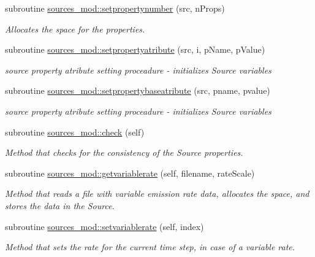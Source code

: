 \begin{DoxyCompactItemize}
subroutine \mbox{\hyperlink{namespacesources__mod_a9c2faf82364c7af60abc1ec25b23c7b5}{sources\+\_\+mod\+::setpropertynumber}} (src, n\+Props)
\begin{DoxyCompactList}\small\item\em Allocates the space for the properties. \end{DoxyCompactList}\item 
subroutine \mbox{\hyperlink{namespacesources__mod_a2b7d1a3856735fdb0fb4ff142e38668d}{sources\+\_\+mod\+::setpropertyatribute}} (src, i, p\+Name, p\+Value)
\begin{DoxyCompactList}\small\item\em source property atribute setting proceadure -\/ initializes Source variables \end{DoxyCompactList}\item 
subroutine \mbox{\hyperlink{namespacesources__mod_ac486d29030348958c06dfebd8ddc0d5e}{sources\+\_\+mod\+::setpropertybaseatribute}} (src, pname, pvalue)
\begin{DoxyCompactList}\small\item\em source property atribute setting proceadure -\/ initializes Source variables \end{DoxyCompactList}\item 
subroutine \mbox{\hyperlink{namespacesources__mod_a6fcfcb690cd1b9375915b01f7ddbe801}{sources\+\_\+mod\+::check}} (self)
\begin{DoxyCompactList}\small\item\em Method that checks for the consistency of the Source properties. \end{DoxyCompactList}\item 
subroutine \mbox{\hyperlink{namespacesources__mod_a66fda4b5042b49bb82d085166c06fcb9}{sources\+\_\+mod\+::getvariablerate}} (self, filename, rate\+Scale)
\begin{DoxyCompactList}\small\item\em Method that reads a file with variable emission rate data, allocates the space, and stores the data in the Source. \end{DoxyCompactList}\item 
subroutine \mbox{\hyperlink{namespacesources__mod_a2777c01e39726d0acdafa7dabd8c1a6d}{sources\+\_\+mod\+::setvariablerate}} (self, index)
\begin{DoxyCompactList}\small\item\em Method that sets the rate for the current time step, in case of a variable rate. \end{DoxyCompactList}\item 

\end{DoxyCompactItemize}
